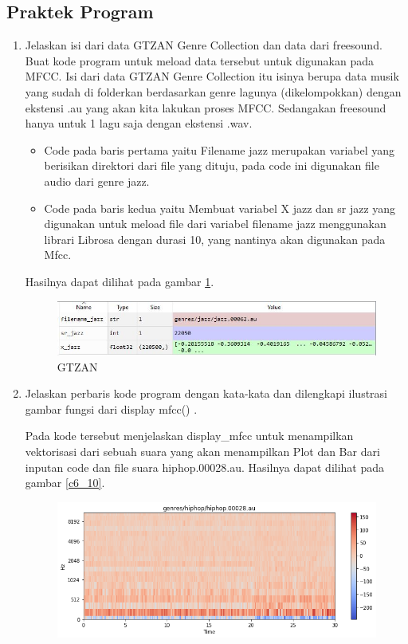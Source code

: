 \subsection{Praktek Program}
\begin{enumerate}
\item Jelaskan isi dari data GTZAN Genre Collection dan data dari freesound. Buat kode program untuk meload data tersebut untuk digunakan pada MFCC.
\subitem Isi dari data GTZAN Genre Collection itu isinya berupa data musik yang sudah di folderkan berdasarkan genre lagunya (dikelompokkan) dengan ekstensi .au yang akan kita lakukan proses MFCC. Sedangakan freesound hanya untuk 1 lagu saja dengan ekstensi .wav.

\begin{itemize}
\item Code pada baris pertama yaitu Filename jazz merupakan variabel yang berisikan direktori dari file yang dituju, pada code ini digunakan file audio dari genre jazz.
\item Code pada baris kedua yaitu Membuat variabel X jazz dan sr jazz yang digunakan untuk meload file dari variabel filename jazz menggunakan librari Librosa dengan durasi 10, yang nantinya akan digunakan pada Mfcc.
\end{itemize}
\subitem Hasilnya dapat dilihat pada gambar \ref{c6_9}.
\begin{figure}[!htbp]
	\centerline{\includegraphics[width=1\textwidth]{figures/huda/chapter6/9.JPG}}
	\caption{GTZAN}
	\label{c6_9}
\end{figure} 
\item Jelaskan perbaris kode program dengan kata-kata dan dilengkapi ilustrasi gambar fungsi dari display mfcc() .

\subitem Pada kode tersebut menjelaskan display\_mfcc untuk menampilkan vektorisasi dari sebuah suara yang akan menampilkan Plot dan Bar dari inputan code dan file suara hiphop.00028.au. Hasilnya dapat dilihat pada gambar \ref{c6_10}.
\begin{figure}[!htbp]
	\centerline{\includegraphics[width=1\textwidth]{figures/huda/chapter6/10.png}}

\end{figure}
\end{enumerate}
